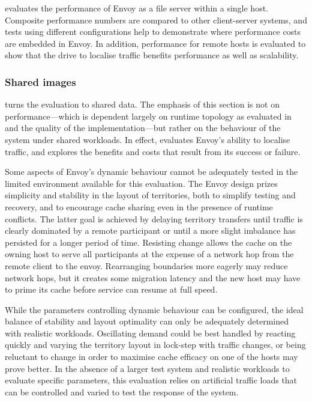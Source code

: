  evaluates the performance of Envoy as a file server within a single host. Composite performance numbers are compared to other client-server systems, and tests using different configurations help to demonstrate where performance costs are embedded in Envoy. In addition, performance for remote hosts is evaluated to show that the drive to localise traffic benefits performance as well as scalability.

\subsubsection{Shared images}

 turns the evaluation to shared data. The emphasis of this section is not on performance---which is dependent largely on runtime topology as evaluated in  and the quality of the implementation---but rather on the behaviour of the system under shared workloads. In effect,  evaluates Envoy's ability to localise traffic, and  explores the benefits and costs that result from its success or failure.

Some aspects of Envoy's dynamic behaviour cannot be adequately tested in the limited environment available for this evaluation. The Envoy design prizes simplicity and stability in the layout of territories, both to simplify testing and recovery, and to encourage cache sharing even in the presence of runtime conflicts. The latter goal is achieved by delaying territory transfers until traffic is clearly dominated by a remote participant or until a more slight imbalance has persisted for a longer period of time. Resisting change allows the cache on the owning host to serve all participants at the expense of a network hop from the remote client to the envoy. Rearranging boundaries more eagerly may reduce network hops, but it creates some migration latency and the new host may have to prime its cache before service can resume at full speed.

While the parameters controlling dynamic behaviour can be configured, the ideal balance of stability and layout optimality can only be adequately determined with realistic workloads. Oscillating demand could be best handled by reacting quickly and varying the territory layout in lock-step with traffic changes, or being reluctant to change in order to maximise cache efficacy on one of the hosts may prove better. In the absence of a larger test system and realistic workloads to evaluate specific parameters, this evaluation relies on artificial traffic loads that can be controlled and varied to test the response of the system.


